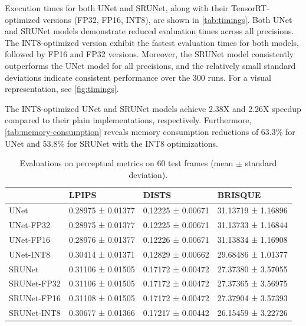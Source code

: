 Execution times for both UNet and SRUNet, along with their TensorRT-optimized versions (FP32, FP16, INT8), are shown in \cref{tab:timings}. Both UNet and SRUNet models demonstrate reduced evaluation times across all precisions. The INT8-optimized version exhibit the fastest evaluation times for both models, followed by FP16 and FP32 versions.
Moreover, the SRUNet model consistently outperforms the UNet model for all precisions, and the relatively small standard deviations indicate consistent performance over the 300 runs.
For a visual representation, see \cref{fig:timings}.

The INT8-optimized UNet and SRUNet models achieve 2.38X and 2.26X speedup compared to their plain implementations, respectively. Furthermore, \cref{tab:memory-consumption} reveals memory consumption reductions of 63.3\% for UNet and 53.8\% for SRUNet with the INT8 optimizations.

\begin{table}[t]
\begin{tabular}{llll}
\toprule
{} &              LPIPS &              DISTS &             BRISQUE \\
\midrule
UNet        &  0.28975 ± 0.01377 &  0.12225 ± 0.00671 &  31.13719 ± 1.16896 \\
UNet-FP32   &  0.28975 ± 0.01377 &  0.12225 ± 0.00671 &  31.13733 ± 1.16844 \\
UNet-FP16   &  0.28976 ± 0.01377 &  0.12226 ± 0.00671 &  31.13834 ± 1.16908 \\
UNet-INT8   &  0.30414 ± 0.01371 &  0.12829 ± 0.00662 &  29.68486 ± 1.01377 \\
\midrule
SRUNet      &  0.31106 ± 0.01505 &  0.17172 ± 0.00472 &  27.37380 ± 3.57055 \\
SRUNet-FP32 &  0.31106 ± 0.01505 &  0.17172 ± 0.00472 &  27.37365 ± 3.56975 \\
SRUNet-FP16 &  0.31108 ± 0.01505 &  0.17172 ± 0.00472 &  27.37904 ± 3.57393 \\
SRUNet-INT8 &  0.30677 ± 0.01366 &  0.17217 ± 0.00442 &  26.15459 ± 3.22726 \\
\bottomrule
\end{tabular}
\caption{Evaluations on perceptual metrics on 60 test frames (mean $\pm$ standard deviation).}
\label{tab:perceptual-metrics}
\end{table}


